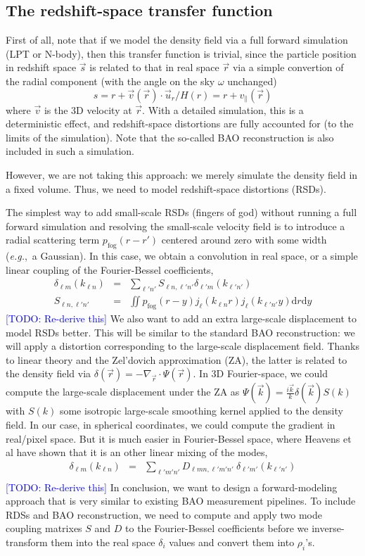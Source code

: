 \documentclass{aastex6}
\newcommand{\eg}{{\textit{e.g.},~}}
\renewcommand{\d}{{\mathrm{d}}}
\newcommand{\equ}[1]{\begin{equation}#1\end{equation}}
\newcommand{\eqn}[1]{\begin{eqnarray}#1\end{eqnarray}}
\newcommand{\todo}[1]{\textcolor{blue}{[TODO: #1]}}
\begin{document}
\subsection{The redshift-space transfer function}

First of all, note that if we model the density field via a full forward simulation (LPT or N-body), then this transfer function is trivial, since the particle position in redshift space $\vec{s}$ is related to that in real space $\vec{r}$ via a simple convertion of the radial component (with the angle on the sky $\omega$ unchanged)
\equ{
	s = r + \vec{v}(\vec{r}) \cdot \vec{u}_r / H(r) = r + v_\parallel(\vec{r}) 
} 
where $\vec{v}$ is the 3D velocity at $\vec{r}$. With a detailed simulation, this is a deterministic effect, and redshift-space distortions are fully accounted for (to the limits of the simulation). 
Note that the so-called BAO reconstruction is also included in such a simulation.

However, we are not taking this approach: we merely simulate the density field in a fixed volume. 
Thus, we need to model redshift-space distortions (RSDs).

The simplest way to add small-scale RSDs (fingers of god) without running a full forward simulation and resolving the small-scale velocity field is to introduce a radial scattering term $p_\mathrm{fog}(r-r')$ centered around zero with some width (\eg a Gaussian). 
In this case, we obtain a convolution in real space, or a simple linear coupling of the Fourier-Bessel coefficients, 
\eqn{
	\delta_{\ell m}(k_{\ell n}) &=& \sum_{\ell 'n'} S_{\ell n, \ell'n'} \delta_{\ell' m}(k_{\ell' n'}) 	\\
	S_{\ell n, \ell'n'}	&=&	\iint  p_\mathrm{fog}( r-y) j_\ell(k_{\ell n}r)  j_\ell(k_{\ell' n'} y)\d r \d y
}
\todo{Re-derive this}
We also want to add an extra large-scale displacement to model RSDs better.
This will be similar to the standard BAO reconstruction: we will apply a distortion corresponding to the large-scale displacement field. 
Thanks to linear theory and the Zel'dovich approximation (ZA), the latter is related to the density field via $\delta(\vec{r}) = -\nabla_{\vec{r}} \cdot \Psi(\vec{r})$. 
In 3D Fourier-space, we could compute the large-scale displacement under the ZA as $\Psi(\vec{k}) = \frac{i\vec{k}}{k} \delta(\vec{k}) S(k)$ with $S(k)$ some isotropic large-scale smoothing kernel applied to the density field.
In our case, in spherical coordinates, we could compute the gradient in real/pixel space. 
But it is much easier in Fourier-Bessel space, where Heavens et al have shown that it is an other linear mixing of the modes,
\eqn{
	\delta_{\ell m}(k_{\ell n}) &=& \sum_{\ell'm'n'} D_{\ell m n, \ell' m' n'}\ \delta_{\ell' m'}(k_{\ell' n'}) 	\\
} 
\todo{Re-derive this}
In conclusion, we want to design a forward-modeling approach that is very similar to existing BAO measurement pipelines. 
To include RDSs and BAO reconstruction, we need to compute and apply two mode coupling matrixes $S$ and $D$ to the Fourier-Bessel coefficients before we inverse-transform them into the real space $\delta_i$ values and convert them into $\rho_i$'s. 
\end{document}
